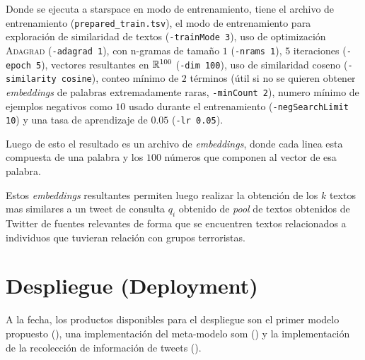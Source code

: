 Donde se ejecuta a \gls{starspace} en modo de entrenamiento, tiene el archivo de entrenamiento (\texttt{prepared\_train.tsv}), el modo de entrenamiento para exploración de similaridad de textos (\texttt{-trainMode 3}), uso de optimización \textsc{Adagrad} (\texttt{-adagrad 1}), con n-gramas de tamaño $1$ (\texttt{-nrams 1}), $5$ iteraciones (\texttt{-epoch 5}), vectores resultantes en $\mathbb{R}^{100}$ (\texttt{-dim 100}), uso de similaridad coseno (\texttt{-similarity cosine}), conteo mínimo de $2$ términos (útil si no se quieren obtener \emph{embeddings} de palabras extremadamente raras, \texttt{-minCount 2}), numero mínimo de ejemplos negativos como $10$ usado durante el entrenamiento (\texttt{-negSearchLimit 10}) y una tasa de aprendizaje de $0.05$ (\texttt{-lr 0.05}).

Luego de esto el resultado es un archivo de \emph{embeddings}, donde cada linea esta compuesta de una palabra y los $100$ números que componen al vector de esa palabra.

Estos \emph{embeddings} resultantes permiten luego realizar la obtención de los $k$ textos mas similares a un tweet de consulta $q_i$ obtenido de \emph{pool} de textos obtenidos de Twitter de fuentes relevantes de forma que se encuentren textos relacionados a individuos que tuvieran relación con grupos terroristas.


\section{Despliegue (Deployment)}
A la fecha, los productos disponibles para el despliegue son el primer modelo propuesto (), una implementación del meta-modelo \gls{som} () y la implementación de la recolección de información de tweets ().

